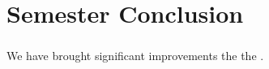 \chapter{Semester Conclusion}
\label{cha:conclusion_final}

\subsection{\launcher}
We have brought significant improvements the the \launcher. 

\subsection{\ct}

\subsection{\gc}